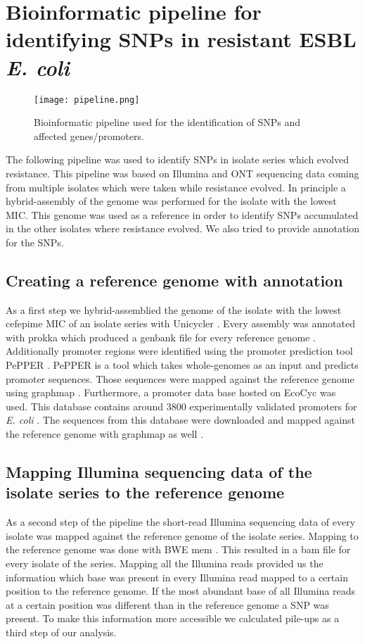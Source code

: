 \section{Bioinformatic pipeline for identifying SNPs in resistant ESBL \textit{E. coli}}
\label{section:pipeline}
\begin{figure}
	\texttt{[image: pipeline.png]}
	\caption{Bioinformatic pipeline used for the identification of SNPs and affected genes/promoters.}
	\label{figure:pipeline}
\end{figure}
The following pipeline was used to identify SNPs in isolate series which evolved resistance. This pipeline was based on Illumina and ONT sequencing data coming from multiple isolates which were taken while resistance evolved. In principle a hybrid-assembly of the genome was performed for the isolate with the lowest MIC. This genome was used as a reference in order to identify SNPs accumulated in the other isolates where resistance evolved. We also tried to provide annotation for the SNPs. 

\subsection{Creating a reference genome with annotation} 
As a first step we hybrid-assemblied the genome of the isolate with the lowest cefepime MIC of an isolate series with Unicycler \cite{wick_unicycler:_2017}. Every assembly was annotated with prokka which produced a genbank file for every reference genome \cite{seemann_prokka:_2014}. Additionally promoter regions were identified using the promoter prediction tool PePPER \cite{pepper}. PePPER is a tool which takes whole-genomes as an input and predicts promoter sequences. Those sequences were mapped against the reference genome using graphmap \cite{sovic_fast_2016}. Furthermore, a promoter data base hosted on EcoCyc was used. This database contains around 3800 experimentally validated promoters for \textit{E. coli} \cite{noauthor_smarttable_nodate}. The sequences from this database were downloaded and mapped against the reference genome with graphmap as well \cite{sovic_fast_2016}. 
\label{section:annotatiion_ref}

\subsection{Mapping Illumina sequencing data of the isolate series to the reference genome}
As a second step of the pipeline the short-read Illumina sequencing data of every isolate was mapped against the reference genome of the isolate series. Mapping to the reference genome was done with BWE mem \cite{li_fast_2009}. This resulted in a bam file for every isolate of the series. Mapping all the Illumina reads provided us the information which base was present in every Illumina read mapped to a certain position to the reference genome. If the most abundant base of all Illumina reads at a certain position was different than in the reference genome a SNP was present. To make this information more accessible we calculated pile-ups as a third step of our analysis. 

